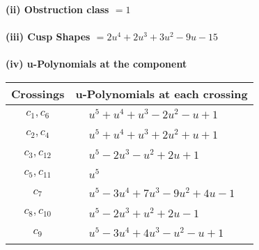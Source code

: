 \documentclass[1p]{elsarticle_modified}
\theoremstyle{definition}
\begin{document}
\flushleft \textbf{(ii) Obstruction class $= 1$}\\~\\
\flushleft \textbf{(iii) Cusp Shapes $= 2 u^4+2 u^3+3 u^2-9 u-15$}\\~\\
\newpage\renewcommand{\arraystretch}{1}
\flushleft \textbf{(iv) u-Polynomials at the component}\newline \\
\begin{tabular}{m{50pt}|m{274pt}}
Crossings & \hspace{64pt}u-Polynomials at each crossing \\
\hline $$\begin{aligned}c_{1},c_{6}\end{aligned}$$&$\begin{aligned}
&u^5+u^4+u^3-2 u^2- u+1
\end{aligned}$\\
\hline $$\begin{aligned}c_{2},c_{4}\end{aligned}$$&$\begin{aligned}
&u^5+u^4+u^3+2 u^2+u+1
\end{aligned}$\\
\hline $$\begin{aligned}c_{3},c_{12}\end{aligned}$$&$\begin{aligned}
&u^5-2 u^3- u^2+2 u+1
\end{aligned}$\\
\hline $$\begin{aligned}c_{5},c_{11}\end{aligned}$$&$\begin{aligned}
&u^5
\end{aligned}$\\
\hline $$\begin{aligned}c_{7}\end{aligned}$$&$\begin{aligned}
&u^5-3 u^4+7 u^3-9 u^2+4 u-1
\end{aligned}$\\
\hline $$\begin{aligned}c_{8},c_{10}\end{aligned}$$&$\begin{aligned}
&u^5-2 u^3+u^2+2 u-1
\end{aligned}$\\
\hline $$\begin{aligned}c_{9}\end{aligned}$$&$\begin{aligned}
&u^5-3 u^4+4 u^3- u^2- u+1
\end{aligned}$\\
\hline
\end{tabular}\\~\\
\end{document}
